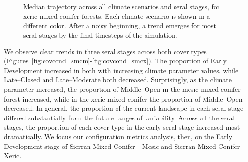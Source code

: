 \begin{figure}[htbp]
 \captionsetup[subfigure]{labelformat=empty}
  \centering
  \\%
   \\
    \caption{Median trajectory across all climate scenarios and seral stages, for xeric mixed conifer forests. Each climate scenario is shown in a different color. After a noisy beginning, a trend emerges for most seral stages by the final timesteps of the simulation.}
  \label{fig:median_trajectory_smcx}
\end{figure} %

We observe clear trends in three seral stages across both cover types (Figures~\ref{fig:covcond_smcm}-\ref{fig:covcond_smcx}). The proportion of Early Development increased in both with increasing climate parameter values, while Late--Closed and Late--Moderate both decreased. Surprisingly, as the climate parameter increased, the proportion of Middle--Open in the mesic mixed conifer forest increased, while in the xeric mixed conifer the proportion of Middle--Open decreased. In general, the proportion of the current landscape in each seral stage differed substantially from the future ranges of variability. Across all the seral stages, the proportion of each cover type in the early seral stage increased most dramatically. We focus our configuration metrics analysis, then, on the Early Development stage of Sierran Mixed Conifer - Mesic and Sierran Mixed Conifer - Xeric.


